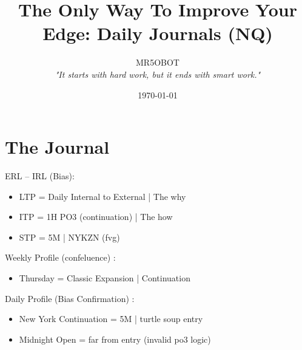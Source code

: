 \documentclass{article}
\title{The Only Way To Improve Your Edge: Daily Journals (NQ)}
\author{MR5OBOT \\ \textit{"It starts with hard work, but it ends with smart work."}}
\date{\today}
\begin{document}
\maketitle
\pagestyle{fancy}
\noindent\hdashrule[0.2ex]{\linewidth}{0.2pt}{1mm} 


\section{The Journal} 
\vspace{0.3cm}

\begin{enumerate}
\begin{notebox}
  \item ERL -- IRL (Bias): 
\end{notebox}

\begin{itemize} 
  \item LTP = \hspace{0.3pt} Daily Internal to External | The why \vspace{0.2cm}
  \item ITP = \hspace{0.3pt} 1H PO3 (continuation) | The how \vspace{0.2cm}
  \item STP = \hspace{0.3pt} 5M | NYKZN (fvg) \vspace{0.2cm}
\end{itemize}

\begin{notebox}
    \item Weekly Profile (confeluence)  : 
\end{notebox}

\begin{itemize} 
  \item Thursday  = \hspace{0.3pt} Classic Expansion | Continuation
\end{itemize}

\begin{notebox}
    \item Daily Profile (Bias Confirmation)  : 
\end{notebox}

\begin{itemize} 
  \item New York Continuation = \hspace{0.3pt} 5M |  turtle soup entry
  \item Midnight Open = \hspace{0.3pt} far from entry (invalid po3 logic)

\end{itemize}
\end{enumerate}
\end{document}
